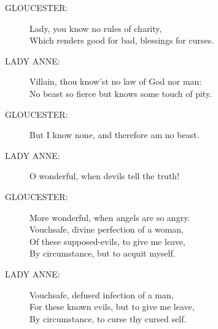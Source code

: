 \documentclass{article}
\begin{document}
\begin{description}
\item[GLOUCESTER:] 
\hspace{1pt}Lady, you know no rules of charity,\\
\hspace{1pt}Which renders good for bad, blessings for curses.\\
\end{description}
\begin{description}
\item[LADY ANNE:] 
\hspace{1pt}Villain, thou know'st no law of God nor man:\\
\hspace{1pt}No beast so fierce but knows some touch of pity.\\
\end{description}
\begin{description}
\item[GLOUCESTER:] 
\hspace{1pt}But I know none, and therefore am no beast.\\
\end{description}
\begin{description}
\item[LADY ANNE:] 
\hspace{1pt}O wonderful, when devils tell the truth!\\
\end{description}
\begin{description}
\item[GLOUCESTER:] 
\hspace{1pt}More wonderful, when angels are so angry.\\
\hspace{1pt}Vouchsafe, divine perfection of a woman,\\
\hspace{1pt}Of these supposed-evils, to give me leave,\\
\hspace{1pt}By circumstance, but to acquit myself.\\
\end{description}
\begin{description}
\item[LADY ANNE:] 
\hspace{1pt}Vouchsafe, defused infection of a man,\\
\hspace{1pt}For these known evils, but to give me leave,\\
\hspace{1pt}By circumstance, to curse thy cursed self.\\
\end{description}
\end{document}
